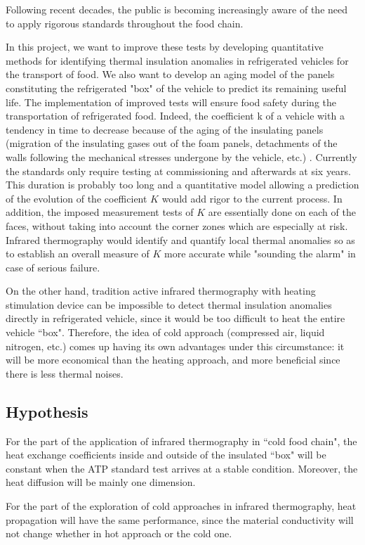 Following recent decades, the public is becoming increasingly aware of the need to apply rigorous standards throughout the food chain.

In this project, we want to improve these tests by developing quantitative methods for identifying thermal insulation anomalies in refrigerated vehicles for the transport of food. We also want to develop an aging model of the panels constituting the refrigerated "box" of the vehicle to predict its remaining useful life. The implementation of improved tests will ensure food safety during the transportation of refrigerated food.
Indeed, the coefficient k of a vehicle with a tendency in time to decrease because of the aging of the insulating panels (migration of the insulating gases out of the foam panels, detachments of the walls following the mechanical stresses undergone by the vehicle, etc.) . Currently the standards only require testing at commissioning and afterwards at six years. This duration is probably too long and a quantitative model allowing a prediction of the evolution of the coefficient $K$ would add rigor to the current process. In addition, the imposed measurement tests of $K$ are essentially done on each of the faces, without taking into account the corner zones which are especially at risk. Infrared thermography would identify and quantify local thermal anomalies so as to establish an overall measure of $K$ more accurate while "sounding the alarm" in case of serious failure.

On the other hand, tradition active infrared thermography with heating stimulation device can be impossible to detect thermal insulation anomalies directly in refrigerated vehicle, since it would be too difficult to heat the entire vehicle ``box". Therefore, the idea of cold approach (compressed air, liquid nitrogen, etc.) comes up having its own advantages under this circumstance: it will be more economical than the heating approach, and more beneficial since there is less thermal noises.

\subsection{Hypothesis}
For the part of the application of infrared thermography in ``cold food chain", the heat exchange coefficients inside and outside of the insulated ``box" will be constant when the ATP standard test arrives at a stable condition. Moreover, the heat diffusion will be mainly one dimension.

For the part of the exploration of cold approaches in infrared thermography, heat propagation will have the same performance, since the material conductivity will not change whether in hot approach or the cold one.
